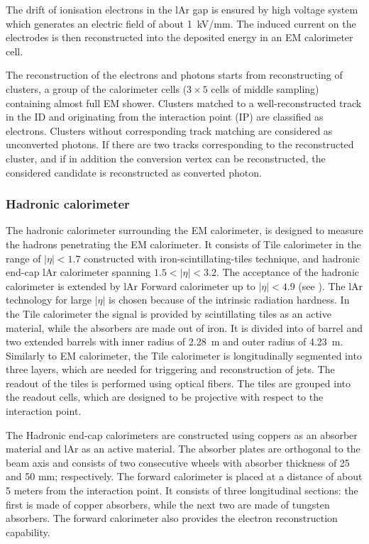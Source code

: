The drift of ionisation electrons in the lAr gap is ensured by high voltage system which generates an electric field of about 1~kV/mm. The induced current on the electrodes is then reconstructed into the deposited energy in an EM calorimeter cell.

The reconstruction of the electrons and photons starts from reconstructing of clusters, a group of the calorimeter cells ($3\times 5$ cells of middle sampling) containing almost full EM shower. Clusters matched to a well-reconstructed track in the ID and originating from the interaction point (IP) are classified as electrons. Clusters without corresponding track matching are considered as unconverted photons. If there are two tracks corresponding to the reconstructed cluster, and if in addition the conversion vertex can be reconstructed, the considered candidate is reconstructed as converted photon.

\subsubsection{Hadronic calorimeter}

The hadronic calorimeter surrounding the EM calorimeter, is designed to measure the hadrons penetrating the EM calorimeter.
It consists of Tile calorimeter in the range of $|\eta|<1.7$ constructed with iron-scintillating-tiles technique, and hadronic end-cap lAr calorimeter spanning $1.5<|\eta|<3.2$. The acceptance of the hadronic calorimeter is extended by lAr Forward calorimeter up to $|\eta|<4.9$ (see ). The lAr technology for large $|\eta|$ is chosen because of the
intrinsic radiation hardness.
In the Tile calorimeter the signal is provided by scintillating tiles as an active material, while the absorbers are made out of iron. It is divided into of barrel and two extended barrels with inner radius of 2.28~m and outer radius of 4.23~m. Similarly to EM calorimeter, the Tile calorimeter is longitudinally segmented into three layers, which are needed for triggering and reconstruction of jets. The readout of the tiles is performed using optical fibers. The tiles are grouped into the readout cells, which are designed to be projective with respect to the interaction point.

The Hadronic end-cap calorimeters are constructed using coppers as an absorber material and lAr as an active material. The absorber plates are orthogonal to the beam axis and consists of two consecutive wheels
with absorber thickness of 25 and 50 mm; respectively. The forward calorimeter is placed at a distance of about 5 meters from the interaction point. It consists of three longitudinal sections: the first is made of copper absorbers, while the next two are made of tungsten absorbers. The forward calorimeter also provides the electron reconstruction capability.

